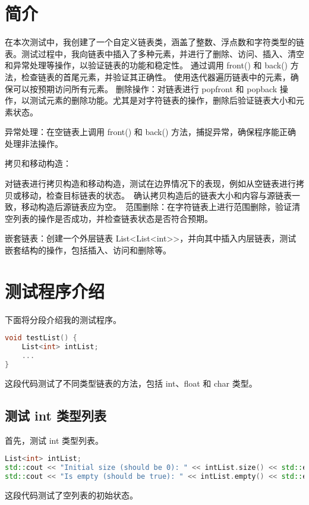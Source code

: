 \documentclass[UTF8]{ctexart}
\begin{document}
\pagestyle{fancy}
\fancyhead{}

\section{简介}

在本次测试中，我创建了一个自定义链表类，涵盖了整数、浮点数和字符类型的链表。测试过程中，我向链表中插入了多种元素，并进行了删除、访问、插入、清空和异常处理等操作，以验证链表的功能和稳定性。
通过调用 front() 和 back() 方法，检查链表的首尾元素，并验证其正确性。
使用迭代器遍历链表中的元素，确保可以按预期访问所有元素。
删除操作：对链表进行 popfront 和 popback 操作，以测试元素的删除功能。尤其是对字符链表的操作，删除后验证链表大小和元素状态。

异常处理：在空链表上调用 front() 和 back() 方法，捕捉异常，确保程序能正确处理非法操作。

拷贝和移动构造：

对链表进行拷贝构造和移动构造，测试在边界情况下的表现，例如从空链表进行拷贝或移动，检查目标链表的状态。\
确认拷贝构造后的链表大小和内容与源链表一致，移动构造后源链表应为空。\
范围删除：在字符链表上进行范围删除，验证清空列表的操作是否成功，并检查链表状态是否符合预期。\

嵌套链表：创建一个外层链表 List<List<int>>，并向其中插入内层链表，测试嵌套结构的操作，包括插入、访问和删除等。\

\section{测试程序介绍}

下面将分段介绍我的测试程序。

\begin{lstlisting}[language=C++]
void testList() {
    List<int> intList;
    ...
}
\end{lstlisting}
这段代码测试了不同类型链表的方法，包括 int、float 和 char 类型。

\subsection{测试 int 类型列表}

首先，测试 int 类型列表。

\begin{lstlisting}[language=C++]
List<int> intList;
std::cout << "Initial size (should be 0): " << intList.size() << std::endl;
std::cout << "Is empty (should be true): " << intList.empty() << std::endl;
\end{lstlisting}
这段代码测试了空列表的初始状态。
\end{document}
